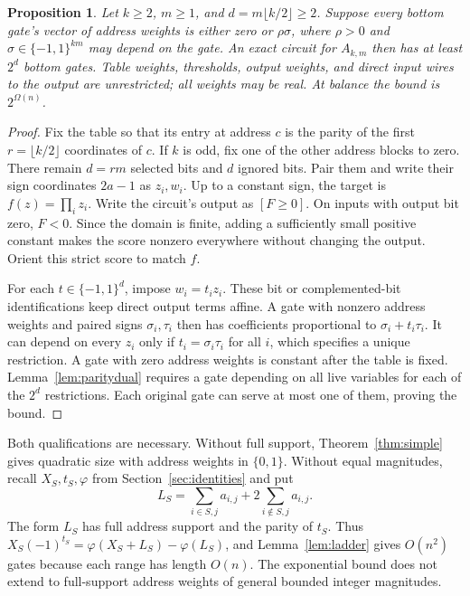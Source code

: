 \documentclass[11pt]{article}
\newtheorem{proposition}[theorem]{Proposition}
\begin{document}
\begin{proposition}\label{thm:fullsign}
Let $k\ge2$, $m\ge1$, and $d=m\lfloor k/2\rfloor\ge2$. Suppose every
bottom gate's vector of address weights is either zero or $\rho\sigma$,
where $\rho>0$ and $\sigma\in\{-1,1\}^{km}$ may depend on the gate.
An exact circuit for $A_{k,m}$ then has at least $2^d$ bottom gates.
Table weights, thresholds, output weights, and direct input wires to
the output are unrestricted; all weights may be real.
At balance the bound is $2^{\Omega(n)}$.
\end{proposition}
\begin{proof}
Fix the table so that its entry at address $c$ is the parity of the
first $r=\lfloor k/2\rfloor$ coordinates of $c$. If $k$ is odd, fix
one of the other address blocks to zero. There remain $d=rm$ selected
bits and $d$ ignored bits. Pair them and write their sign coordinates
$2a-1$ as $z_i,w_i$. Up to a constant sign, the target is
$f(z)=\prod_i z_i$.
Write the circuit's output as $[F\ge0]$. On inputs with output bit zero,
$F<0$. Since the domain is finite, adding a sufficiently small positive
constant makes the score nonzero everywhere without changing the
output. Orient this strict score to match $f$.

For each $t\in\{-1,1\}^d$, impose $w_i=t_i z_i$.
These bit or complemented-bit identifications keep direct output
terms affine.
A gate with nonzero address weights and paired signs $\sigma_i,\tau_i$
then has coefficients proportional to $\sigma_i+t_i\tau_i$.
It can depend on every $z_i$ only if $t_i=\sigma_i\tau_i$ for all $i$,
which specifies a unique restriction. A gate with zero address weights
is constant after the table is fixed.
Lemma~\ref{lem:paritydual} requires a gate depending on all live variables
for each of the $2^d$ restrictions. Each original gate can serve at most
one of them, proving the bound.
\end{proof}

Both qualifications are necessary. Without full support,
Theorem~\ref{thm:simple} gives quadratic size with address weights in
$\{0,1\}$. Without equal magnitudes, recall $X_S,t_S,\varphi$ from
Section~\ref{sec:identities} and put
$$L_S=\sum_{i\in S,j}a_{i,j}+2\sum_{i\notin S,j}a_{i,j}.$$
The form $L_S$ has full address support and the parity of $t_S$.
Thus $X_S(-1)^{t_S}=\varphi(X_S+L_S)-\varphi(L_S)$, and
Lemma~\ref{lem:ladder} gives $O(n^2)$ gates because each range has
length $O(n)$. The exponential bound does not extend to full-support
address weights of general bounded integer magnitudes.
\end{document}
